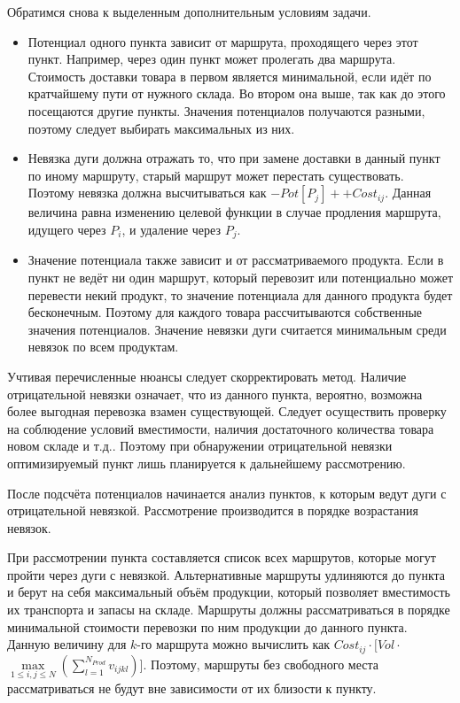 	Обратимся снова к выделенным дополнительным условиям задачи.
	\begin{itemize}
		\item Потенциал одного пункта зависит от маршрута, проходящего через этот пункт. Например, через один пункт может пролегать два маршрута. Стоимость доставки товара в первом является минимальной, если идёт по кратчайшему пути от нужного склада. Во втором она выше, так как до этого посещаются другие пункты. Значения потенциалов получаются разными, поэтому следует выбирать максимальных из них.
		\item Невязка дуги должна отражать то, что при замене доставки в данный пункт по иному маршруту, старый маршрут может перестать существовать. Поэтому невязка должна высчитываться как $-Pot[P_j] + + Cost_{ij}$. Данная величина равна изменению целевой функции в случае продления маршрута, идущего через $P_i$, и удаление через $P_j$.
		\item Значение потенциала также зависит и от рассматриваемого продукта. Если в пункт не ведёт ни один маршрут, который перевозит или потенциально может перевести некий продукт, то значение потенциала для данного продукта будет бесконечным. Поэтому для каждого товара рассчитываются собственные значения потенциалов. Значение невязки дуги считается минимальным среди невязок по всем продуктам.
	\end{itemize}

	Учтивая перечисленные нюансы следует скорректировать метод. Наличие отрицательной невязки означает, что из данного пункта, вероятно, возможна более выгодная перевозка взамен существующей. Следует осуществить проверку на соблюдение условий вместимости, наличия достаточного количества товара новом складе и т.д.. Поэтому при обнаружении отрицательной невязки оптимизируемый пункт лишь планируется к дальнейшему рассмотрению.
	
	После подсчёта потенциалов начинается анализ пунктов, к которым ведут дуги с отрицательной невязкой. Рассмотрение производится в порядке возрастания невязок. 
	
	При рассмотрении пункта составляется список всех маршрутов, которые могут пройти через дуги с невязкой. Альтернативные маршруты удлиняются до пункта и берут на себя максимальный объём продукции, который позволяет вместимость их транспорта и запасы на складе. Маршруты должны рассматриваться в порядке минимальной стоимости перевозки по ним продукции до данного пункта. Данную величину для $k$-го маршрута можно вычислить как $Cost_{ij} \cdot [Vol \cdot $\(\max\limits_{1 \leq i, j \leq N}\)$ (\sum_{l=1}^{N_{Prod}} v_{ijkl})]$. Поэтому, маршруты без свободного места рассматриваться не будут вне зависимости от их близости к пункту. 
	
